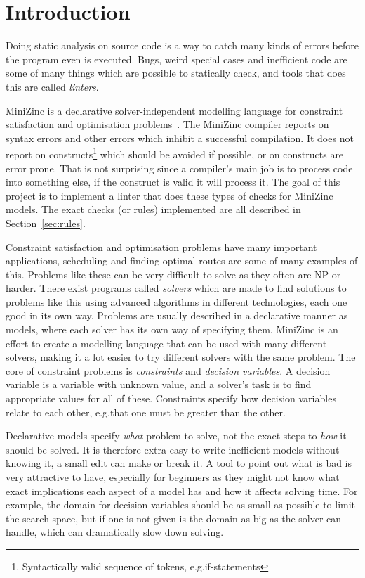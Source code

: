 \documentclass[a4paper,12pt]{article}
\begin{document}
\section{Introduction}\label{sec:introduktion}
Doing static analysis on source code is a way to catch many kinds of errors before
the program even is executed. Bugs, weird special cases and
inefficient code are some of many things which are possible to statically check, and tools
that does this are called \emph{linters}.

MiniZinc is a declarative solver-independent modelling language for constraint
satisfaction and optimisation problems~\cite{MiniZinc}. The MiniZinc compiler reports on syntax errors
and other errors which inhibit a successful compilation. It does not report on
constructs\footnote{Syntactically valid sequence of tokens, e.g.\@ if-statements}
which should be avoided if possible, or on constructs are error prone.
That is not surprising since a compiler's main job is to process code into something else,
if the construct is valid it will process it.
The goal of this project is to implement a linter that does these types of checks for
MiniZinc models. The exact checks (or rules) implemented are all described in
Section~\ref{sec:rules}.

Constraint satisfaction and optimisation problems have many important applications,
scheduling and finding optimal routes are some of many examples of this. Problems like
these can be very difficult to solve as they often are NP or harder. There exist programs
called \emph{solvers} which are made to find solutions to problems like this using
advanced algorithms in different technologies, each one good in its own way.
Problems are usually described in a declarative manner as models, where each solver has
its own way of specifying them. MiniZinc is an effort to
create a modelling language that can be used with many different solvers, making it a lot
easier to try different solvers with the same problem. The core of constraint problems is
\emph{constraints} and \emph{decision variables}. A decision variable is a variable with
unknown value, and a solver's task is to find appropriate values for all of these.
Constraints specify how decision variables relate to each other, e.g.\@ that one must be
greater than the other.

Declarative models specify \emph{what} problem to solve, not the exact steps to \emph{how}
it should be solved. It is therefore extra easy to write inefficient models without
knowing it, a small edit can make or break it. A tool to point out what is bad is very
attractive to have, especially for beginners as they might not know what exact
implications each aspect of a model has and how it affects solving time. For example, the
domain for decision variables should be as small as possible to limit the search space,
but if one is not given is the domain as big as the solver can handle, which can
dramatically slow down solving.
\end{document}

